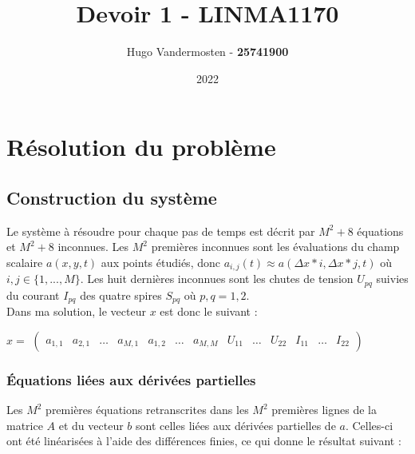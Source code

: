 \documentclass[11pt]{article}
\title{Devoir 1 - \textbf{LINMA1170}}
\author{Hugo Vandermosten - \textbf{25741900}}
\date{2022}
\begin{document}

\maketitle

\section{Résolution du problème}

\subsection{Construction du système}

Le système à résoudre pour chaque pas de temps est décrit par $M^2 + 8$ équations et $M^2 + 8$ inconnues. Les $M^2$ premières inconnues sont les évaluations du champ scalaire $a(x,y,t)$ aux points étudiés, donc $a_{i,j}(t) \approx a(\Delta x*i, \Delta x*j, t)$  où  $i,j \in \{ 1,...,M \}$. Les huit dernières inconnues sont les chutes de tension $U_{pq}$ suivies du courant $I_{pq}$ des quatre spires $S_{pq}$ où $p,q = 1,2$. \\
Dans ma solution, le vecteur $x$ est donc le suivant : 
\begin{center}
    $x =$
    $\left(
    \begin{smallmatrix}
       a_{1,1} & a_{2,1} & \hdots & a_{M,1} & a_{1,2} & \hdots & a_{M,M} & U_{11} & \hdots & U_{22} & I_{11} & \hdots & I_{22}
    \end{smallmatrix}
    \right)$
\end{center}

\subsubsection{Équations liées aux dérivées partielles}

Les $M^2$ premières équations retranscrites dans les $M^2$ premières lignes de la matrice $A$ et du vecteur $b$ sont celles liées aux dérivées partielles de $a$. Celles-ci ont été linéarisées à l'aide des différences finies, ce qui donne le résultat suivant :
\end{document}
